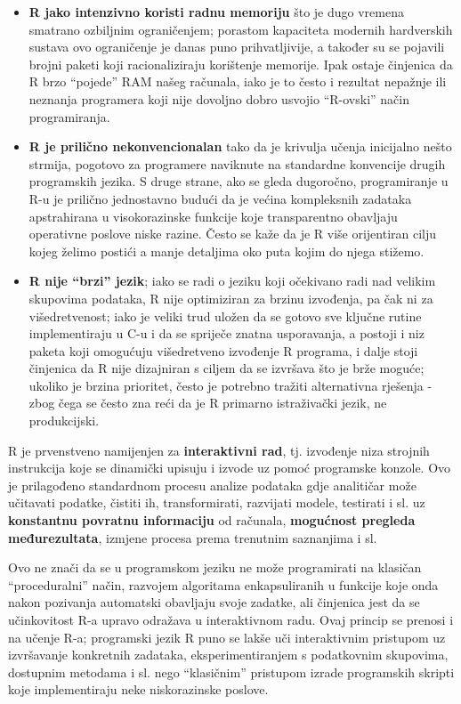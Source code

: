 \documentclass[]{book}
\theoremstyle{definition}
\theoremstyle{definition}
\theoremstyle{definition}
\theoremstyle{remark}
\begin{document}
\begin{itemize}
\item
  \textbf{R jako intenzivno koristi radnu memoriju} što je dugo vremena
  smatrano ozbiljnim ograničenjem; porastom kapaciteta modernih
  hardverskih sustava ovo ograničenje je danas puno prihvatljivije, a
  također su se pojavili brojni paketi koji racionaliziraju korištenje
  memorije. Ipak ostaje činjenica da R brzo ``pojede'' RAM našeg
  računala, iako je to često i rezultat nepažnje ili neznanja programera
  koji nije dovoljno dobro usvojio ``R-ovski'' način programiranja.
\item
  \textbf{R je prilično nekonvencionalan} tako da je krivulja učenja
  inicijalno nešto strmija, pogotovo za programere naviknute na
  standardne konvencije drugih programskih jezika. S druge strane, ako
  se gleda dugoročno, programiranje u R-u je prilično jednostavno budući
  da je većina kompleksnih zadataka apstrahirana u visokorazinske
  funkcije koje transparentno obavljaju operativne poslove niske razine.
  Često se kaže da je R više orijentiran cilju kojeg želimo postići a
  manje detaljima oko puta kojim do njega stižemo.
\item
  \textbf{R nije ``brzi'' jezik}; iako se radi o jeziku koji očekivano
  radi nad velikim skupovima podataka, R nije optimiziran za brzinu
  izvođenja, pa čak ni za višedretvenost; iako je veliki trud uložen da
  se gotovo sve ključne rutine implementiraju u C-u i da se spriječe
  znatna usporavanja, a postoji i niz paketa koji omogućuju višedretveno
  izvođenje R programa, i dalje stoji činjenica da R nije dizajniran s
  ciljem da se izvršava što je brže moguće; ukoliko je brzina prioritet,
  često je potrebno tražiti alternativna rješenja - zbog čega se često
  zna reći da je R primarno istraživački jezik, ne produkcijski.
\end{itemize}

R je prvenstveno namijenjen za \textbf{interaktivni rad}, tj. izvođenje
niza strojnih instrukcija koje se dinamički upisuju i izvode uz pomoć
programske konzole. Ovo je prilagođeno standardnom procesu analize
podataka gdje analitičar može učitavati podatke, čistiti ih,
transformirati, razvijati modele, testirati i sl. uz \textbf{konstantnu
povratnu informaciju} od računala, \textbf{mogućnost pregleda
međurezultata}, izmjene procesa prema trenutnim saznanjima i sl.

Ovo ne znači da se u programskom jeziku ne može programirati na klasičan
``proceduralni'' način, razvojem algoritama enkapsuliranih u funkcije
koje onda nakon pozivanja automatski obavljaju svoje zadatke, ali
činjenica jest da se učinkovitost R-a upravo odražava u interaktivnom
radu. Ovaj princip se prenosi i na učenje R-a; programski jezik R puno
se lakše uči interaktivnim pristupom uz izvršavanje konkretnih zadataka,
eksperimentiranjem s podatkovnim skupovima, dostupnim metodama i sl.
nego ``klasičnim'' pristupom izrade programskih skripti koje
implementiraju neke niskorazinske poslove.
\end{document}
